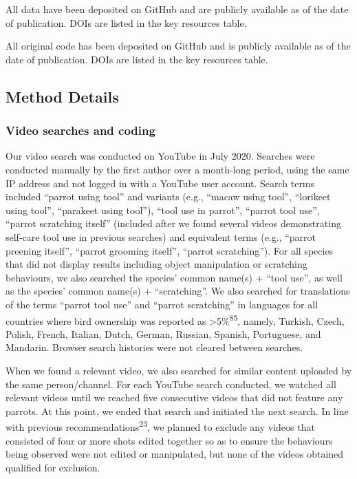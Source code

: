 \documentclass[
  man, donotrepeattitle,floatsintext]{apa6}
\begin{document}
All data have been deposited on GitHub and are publicly available as of the date
of publication. DOIs are listed in the key resources table.

All original code has been deposited on GitHub and is publicly available as of
the date of publication. DOIs are listed in the key resources table.

\hypertarget{method-details}{%
\subsection{Method Details}\label{method-details}}

\hypertarget{video-searches-and-coding}{%
\subsubsection{Video searches and coding}\label{video-searches-and-coding}}

Our video search was conducted on YouTube in July 2020. Searches were conducted
manually by the first author over a month-long period, using the same IP address
and not logged in with a YouTube user account. Search terms included
``parrot using tool'' and variants (e.g., ``macaw using tool'', ``lorikeet using
tool'', ``parakeet using tool''), ``tool use in parrot'', ``parrot tool use'', ``parrot
scratching itself'' (included after we found several videos demonstrating
self-care tool use in previous searches) and equivalent terms (e.g., ``parrot
preening itself'', ``parrot grooming itself'', ``parrot scratching''). For all
species that did not display results including object manipulation or scratching
behaviours, we also searched the species' common name(s) + ``tool use'', as well
as the species' common name(s) + ``scratching''. We also searched for translations
of the terms ``parrot tool use'' and ``parrot scratching'' in languages for all
countries where bird ownership was reported as \textgreater5\%\textsuperscript{85}, namely,
Turkish, Czech, Polish, French, Italian, Dutch, German, Russian, Spanish,
Portuguese, and Mandarin. Browser search histories were not cleared between
searches.

When we found a relevant video, we also searched for similar content uploaded by
the same person/channel. For each YouTube search conducted, we watched all
relevant videos until we reached five consecutive videos that did not feature
any parrots. At this point, we ended that search and initiated the next search.
In line with previous recommendations\textsuperscript{23}, we planned to exclude any
videos that consisted of four or more shots edited together so as to ensure the
behaviours being observed were not edited or manipulated, but none of the videos
obtained qualified for exclusion.
\end{document}
